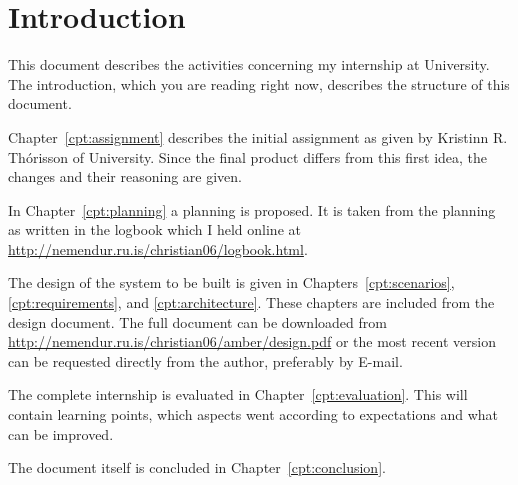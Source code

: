 \chapter{\label{cpt:introduction}Introduction}

This document describes the activities concerning my internship at \Rvk{}
University. The introduction, which you are reading right now, describes the
structure of this document.

Chapter~\ref{cpt:assignment} describes the initial assignment as given by
Kristinn R.  Th\'orisson of \Rvk{} University. Since the final product differs
from this first idea, the changes and their reasoning are given.

In Chapter~\ref{cpt:planning} a planning is proposed. It is taken from the
planning as written in the logbook which I held online at
\url{http://nemendur.ru.is/christian06/logbook.html}.

The design of the system to be built is given in Chapters~\ref{cpt:scenarios},
\ref{cpt:requirements}, and \ref{cpt:architecture}. These chapters are included
from the design document. The full document can be downloaded from
\url{http://nemendur.ru.is/christian06/amber/design.pdf} or the most recent
version can be requested directly from the author, preferably by E-mail.

The complete internship is evaluated in Chapter~\ref{cpt:evaluation}. This will
contain learning points, which aspects went according to expectations and what
can be improved.

The document itself is concluded in Chapter~\ref{cpt:conclusion}.

